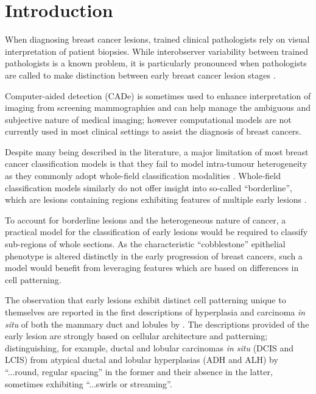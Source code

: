 \section{Introduction}

When diagnosing breast cancer lesions, trained clinical pathologists rely on 
visual interpretation of patient biopsies. While interobserver variability 
between trained pathologists is a known problem, it is particularly pronounced 
when pathologists are called to make distinction between early breast cancer 
lesion stages \citep{gomes2014}.\par

Computer-aided detection (CADe) is sometimes used to enhance 
interpretation of imaging from screening mammographies and can help manage the ambiguous and subjective nature of medical imaging; however computational models 
are not currently used in most clinical settings to assist the diagnosis of breast 
cancers.\par

Despite many being described in the literature, a major limitation of most breast 
cancer classification models is that they fail to model intra-tumour heterogeneity 
as they commonly adopt whole-field classification modalities
\citep{pareja2017,weigelt2010}. Whole-field classification models similarly do
not offer insight into so-called ``borderline'', which are lesions containing regions exhibiting features of multiple early lesions \citep{masood2011}.\par

To account for borderline lesions and the heterogeneous nature of cancer, a practical model for the classification of early lesions would be required to classify sub-regions of whole sections. As the characteristic ``cobblestone'' epithelial phenotype is altered distinctly
in the early progression of breast cancers, such a model would benefit from leveraging features which are based on differences in cell patterning.\par

The observation that early lesions exhibit distinct cell patterning unique to themselves are reported in the first descriptions of hyperplasia and carcinoma \textit{in situ} of both the mammary duct and lobules by \cite{page1982}. The descriptions provided of the early lesion are strongly based on cellular architecture and patterning; distinguishing, for example, ductal and lobular carcinomas \emph{in situ} (DCIS and LCIS) from atypical ductal and lobular hyperplasias  (ADH and ALH) by ``...round, regular spacing''  in the former and their absence in the latter, sometimes exhibiting ``...swirls or streaming''.\par

